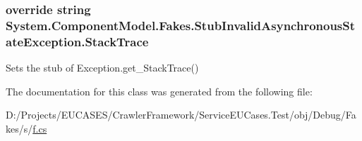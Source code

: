 \hypertarget{class_system_1_1_component_model_1_1_fakes_1_1_stub_invalid_asynchronous_state_exception_a4150ab3d10c97b74e757f5d65cb48350}{
\subsubsection[{Stack\-Trace}]{\setlength{\rightskip}{0pt plus 5cm}override string System.\-Component\-Model.\-Fakes.\-Stub\-Invalid\-Asynchronous\-State\-Exception.\-Stack\-Trace\hspace{0.3cm}{\ttfamily [get]}}}\label{class_system_1_1_component_model_1_1_fakes_1_1_stub_invalid_asynchronous_state_exception_a4150ab3d10c97b74e757f5d65cb48350}


Sets the stub of Exception.\-get\-\_\-\-Stack\-Trace()



The documentation for this class was generated from the following file\-:\begin{DoxyCompactItemize}
\item 
D\-:/\-Projects/\-E\-U\-C\-A\-S\-E\-S/\-Crawler\-Framework/\-Service\-E\-U\-Cases.\-Test/obj/\-Debug/\-Fakes/s/\hyperlink{s_2f_8cs}{f.\-cs}\end{DoxyCompactItemize}
